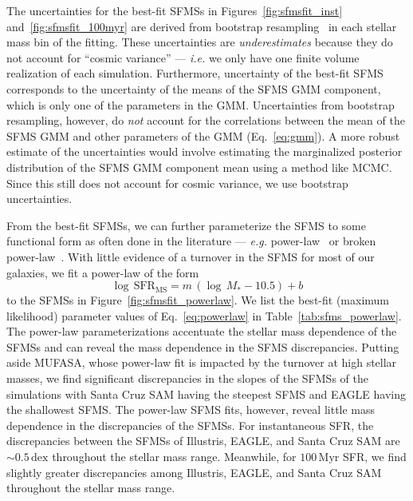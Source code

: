 \documentclass[preprint2,tighten]{aastex62}
\begin{document}
The uncertainties for the best-fit SFMSs in Figures~\ref{fig:sfmsfit_inst} 
and~\ref{fig:sfmsfit_100myr} are derived from bootstrap resampling~\citep{efron1979} 
in each stellar mass bin of the fitting. These uncertainties are \emph{underestimates} because 
they do not account for ``cosmic variance'' --- \emph{i.e.} we only have one 
finite volume realization of each simulation. Furthermore, uncertainty of the best-fit 
SFMS corresponds to the uncertainty of the means of the SFMS GMM component, 
which is only one of the parameters in the GMM. Uncertainties from bootstrap 
resampling, however, do \emph{not} account for the correlations between the 
mean of the SFMS GMM and other
parameters of the GMM (Eq.~\ref{eq:gmm}). A more robust estimate of the 
uncertainties would involve estimating the marginalized posterior distribution 
of the SFMS GMM component mean using a method like MCMC. Since this still 
does not account for cosmic variance, we use bootstrap uncertainties. 

From the best-fit SFMSs, we can further 
parameterize the SFMS to some functional form as often done in the 
literature --- \emph{e.g.} power-law~\citep{speagle2014} or broken 
power-law~\citep{lee2015}. With little evidence of a turnover in the 
SFMS for most of our galaxies, we fit a power-law of the form 
\begin{equation} \label{eq:powerlaw}
\log\,\mathrm{SFR}_\mathrm{MS} = m\,(\log\,M_* - 10.5) + b
\end{equation}
to the SFMSs in Figure~\ref{fig:sfmsfit_powerlaw}. We list the best-fit 
(maximum likelihood) parameter values of Eq.~\ref{eq:powerlaw} in 
Table~\ref{tab:sfms_powerlaw}. The power-law parameterizations accentuate 
the stellar mass dependence of the SFMSs and can reveal the mass dependence 
in the SFMS discrepancies. Putting aside MUFASA, whose power-law fit is 
impacted by the turnover at high stellar masses, we find significant
discrepancies in the slopes of the SFMSs of the simulations with Santa Cruz 
SAM having the steepest SFMS and EAGLE having the shallowest SFMS. The 
power-law SFMS fits, however, reveal little 
mass dependence in the discrepancies of the SFMSs. For instantaneous SFR, 
the discrepancies between the SFMSs of Illustris, EAGLE, and Santa Cruz SAM are 
$\sim 0.5\,\mathrm{dex}$ throughout the stellar mass range. Meanwhile, 
for $100\,\mathrm{Myr}$ SFR, we find slightly
greater discrepancies among Illustris, EAGLE, and Santa Cruz SAM throughout
the stellar mass range.
\end{document}
